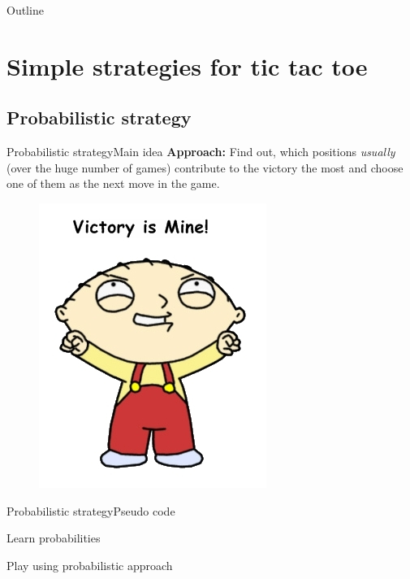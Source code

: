 \documentclass[aspectratio=169]{beamer}
\begin{document}
\begin{frame}
  \titlepage
\end{frame}

\begin{frame}{Outline }
  \tableofcontents
\end{frame}

\section{Simple strategies for tic tac toe}

\subsection{Probabilistic strategy}

\begin{frame}{Probabilistic strategy}{Main idea}
\textbf{Approach:}
Find out, which positions \textit{usually} (over the huge number of games) contribute to the victory the most and choose one of them as the next move in the game.
\begin{figure}
	\includegraphics[scale = 0.5]{victory.jpg}	
\end{figure}
\end{frame}

\begin{frame}{Probabilistic strategy}{Pseudo code}
\begin{block}{Learn probabilities}
\Probabilistic

\end{block}
\begin{block}{Play using probabilistic approach}
\ProbabilisticPlay
\end{block}
\end{frame}
\end{document}
